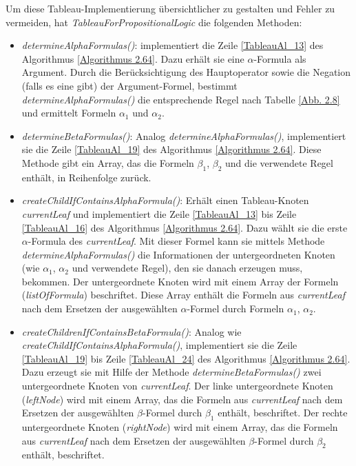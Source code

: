 Um diese Tableau-Implementierung übersichtlicher zu gestalten und Fehler zu vermeiden, hat \textit{TableauForPropositionalLogic} die folgenden Methoden:
\begin{itemize}
\item	\textit{determineAlphaFormulas()}: implementiert die Zeile \ref{TableauAl_13} des Algorithmus \ref{Algorithmus 2.64}. Dazu erhält sie eine $\alpha$-Formula als Argument. Durch die Berücksichtigung des Hauptoperator sowie die Negation (falls es eine gibt) der Argument-Formel, bestimmt \textit{determineAlphaFormulas()} die entsprechende Regel nach Tabelle \ref{Abb. 2.8} und ermittelt Formeln $\alpha_1$ und $\alpha_2$.
\item	\textit{determineBetaFormulas()}:  Analog \textit{determineAlphaFormulas()}, implementiert sie die Zeile \ref{TableauAl_19} des Algorithmus \ref{Algorithmus 2.64}. Diese Methode gibt ein Array, das die Formeln $\beta_1$, $\beta_2$ und die verwendete Regel enthält, in Reihenfolge zurück.
\item 	\textit{createChildIfContainsAlphaFormula()}: Erhält einen Tableau-Knoten \textit{currentLeaf} und implementiert die Zeile \ref{TableauAl_13} bis Zeile  \ref{TableauAl_16} des Algorithmus \ref{Algorithmus 2.64}. Dazu wählt sie die erste  $\alpha$-Formula des \textit{currentLeaf}. Mit dieser Formel kann sie mittels Methode \textit{determineAlphaFormulas()} die Informationen der untergeordneten Knoten (wie $\alpha_1$, $\alpha_2$ und  verwendete Regel), den sie danach erzeugen muss, bekommen. Der untergeordnete Knoten wird mit einem Array der Formeln (\textit{listOfFormula}) beschriftet. Diese Array enthält die Formeln aus \textit{currentLeaf} nach dem Ersetzen der ausgewählten $\alpha$-Formel durch Formeln $\alpha_1$, $\alpha_2$.
\item 	\textit{createChildrenIfContainsBetaFormula()}: Analog wie \textit{createChildIfContainsAlphaFormula()}, implementiert sie die Zeile \ref{TableauAl_19} bis Zeile \ref{TableauAl_24} des Algorithmus \ref{Algorithmus 2.64}. Dazu erzeugt sie mit Hilfe der Methode \textit{determineBetaFormulas()} zwei untergeordnete Knoten von \textit{currentLeaf}. Der linke untergeordnete Knoten (\textit{leftNode}) wird mit einem Array, das die Formeln aus \textit{currentLeaf} nach dem Ersetzen der ausgewählten $\beta$-Formel durch $\beta_1$ enthält, beschriftet. Der rechte untergeordnete Knoten (\textit{rightNode}) wird mit einem Array, das die Formeln aus \textit{currentLeaf} nach dem Ersetzen der ausgewählten $\beta$-Formel durch $\beta_2$ enthält, beschriftet. 
\end{itemize}

